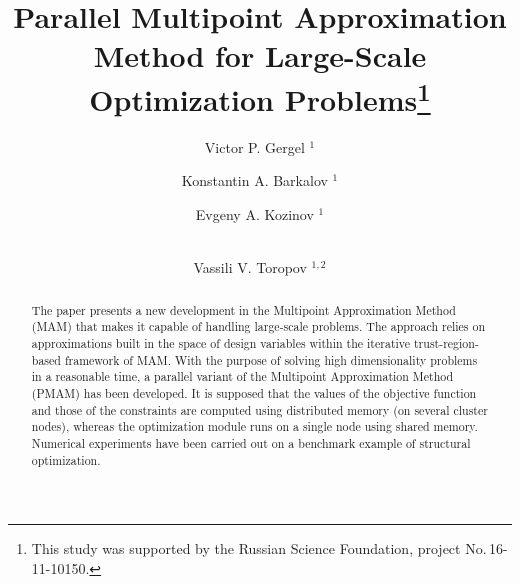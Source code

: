 \documentclass[runningheads,a4paper]{llncs}
\begin{document}
\mainmatter  %

\title{Parallel Multipoint Approximation Method for Large-Scale Optimization Problems\thanks{This
study was supported by the Russian Science Foundation, project
No.\,16-11-10150.}}


\author{Victor P. Gergel%
$^1$ \and
Konstantin A. Barkalov%
$^1$ \and
Evgeny A. Kozinov%
$^1$ \and \\
Vassili V. Toropov%
$^{1,2}$
}
%


%
%

\maketitle

\begin{abstract}
The paper presents a new development in the Multipoint Approximation Method
(MAM) that makes it capable of handling large-scale problems. The approach
relies on approximations built in the space of design variables within the
iterative trust-region-based framework of MAM. With the purpose of solving high
dimensionality problems in a reasonable time, a parallel variant of the
Multipoint Approximation Method (PMAM) has been developed. It is supposed that
the values of the objective function and those of the constraints are computed
using distributed memory (on several cluster nodes), whereas the optimization
module runs on a single node using shared memory. Numerical experiments have
been carried out on a benchmark example of structural optimization.

\end{abstract}
\end{document}
